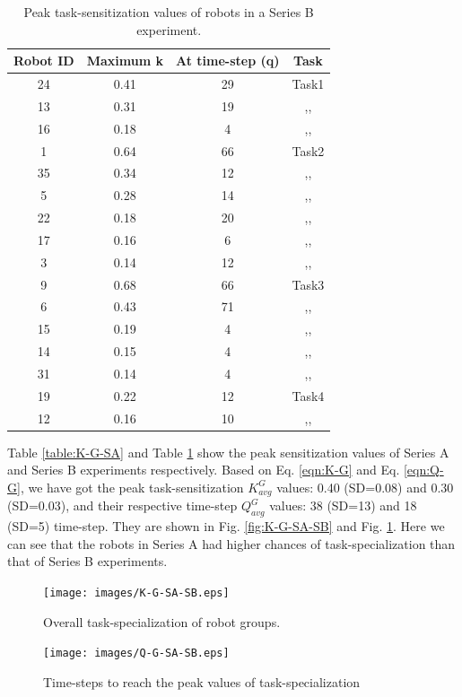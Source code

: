 \documentclass[preprint,12pt]{elsarticle}
\begin{document}
\begin{table}
\centering
\caption{Peak task-sensitization values of robots in a Series B experiment.}
\begin{tabular}{|c|c|c|c|}
\hline \textbf{Robot ID} & \textbf{Maximum k} & \textbf{At time-step (q)} & \textbf{Task} \\
\hline 24 & 0.41 & 29 & Task1\\
\hline 13 & 0.31 & 19 & ,,\\
\hline 16 & 0.18 & 4 & ,,\\
\hline 1 & 0.64 & 66 & Task2\\
\hline 35 & 0.34 & 12 & ,,\\
\hline 5 & 0.28 & 14 & ,,\\
\hline 22 & 0.18 & 20 & ,,\\
\hline 17 & 0.16 & 6 & ,,\\
\hline 3 & 0.14 & 12 & ,,\\
\hline 9 & 0.68 & 66 & Task3\\
\hline 6 & 0.43 & 71 & ,,\\
\hline 15 & 0.19 & 4 & ,,\\
\hline 14 & 0.15 & 4 & ,,\\
\hline 31 & 0.14 & 4 & ,,\\
\hline 19 & 0.22 & 12 & Task4\\
\hline 12 & 0.16 & 10 & ,,\\
\hline 
\end{tabular} 
\label{table:K-G-SB}
\end{table}
Table \ref{table:K-G-SA} and Table \ref{table:K-G-SB} show the peak sensitization values of Series A and Series B experiments respectively.  Based on Eq. \ref{eqn:K-G} and Eq. \ref{eqn:Q-G}, we have got the peak task-sensitization $K^G_{avg} 
$ values: 0.40 (SD=0.08)  and 0.30 (SD=0.03), and their respective time-step $Q^G_{avg}$ values: 38 (SD=13) and 18 (SD=5) time-step.  They are shown in Fig. \ref{fig:K-G-SA-SB} and Fig. \ref{fig:Q-G-SA-SB}. Here we can see that the robots in Series A had higher chances of task-specialization than that of Series B experiments.
\begin{figure}
\centering
\texttt{[image: images/K-G-SA-SB.eps]}
\caption{ Overall task-specialization of robot groups.}
\label{fig:K-G-SA-SB} 
\centering
\texttt{[image: images/Q-G-SA-SB.eps]}
\caption{Time-steps to reach the peak values of task-specialization}
\label{fig:Q-G-SA-SB} 
\end{figure}
\end{document}

